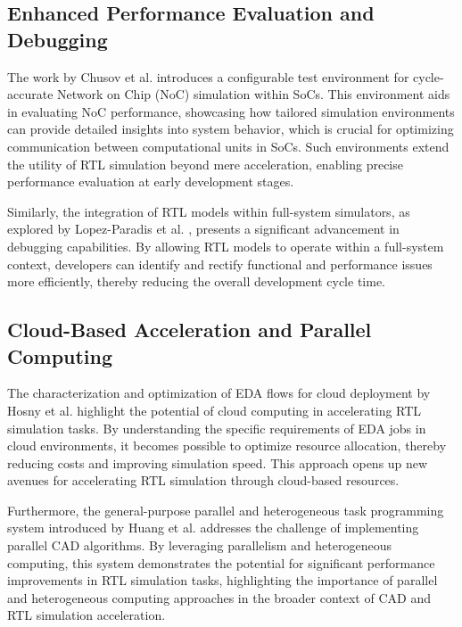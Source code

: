 \documentclass[conference]{IEEEtran}
\begin{document}
\subsection{Enhanced Performance Evaluation and Debugging}

The work by Chusov et al. \cite{chusovConfigurableTestEnvironment2021} introduces a configurable test environment for cycle-accurate Network on Chip (NoC) simulation within SoCs. This environment aids in evaluating NoC performance, showcasing how tailored simulation environments can provide detailed insights into system behavior, which is crucial for optimizing communication between computational units in SoCs. Such environments extend the utility of RTL simulation beyond mere acceleration, enabling precise performance evaluation at early development stages.

Similarly, the integration of RTL models within full-system simulators, as explored by Lopez-Paradis et al. \cite{lopez-paradisGem5RtlFramework2021}, presents a significant advancement in debugging capabilities. By allowing RTL models to operate within a full-system context, developers can identify and rectify functional and performance issues more efficiently, thereby reducing the overall development cycle time.

\subsection{Cloud-Based Acceleration and Parallel Computing}

The characterization and optimization of EDA flows for cloud deployment by Hosny et al. \cite{hosnyCharacterizingOptimizingEDA2021} highlight the potential of cloud computing in accelerating RTL simulation tasks. By understanding the specific requirements of EDA jobs in cloud environments, it becomes possible to optimize resource allocation, thereby reducing costs and improving simulation speed. This approach opens up new avenues for accelerating RTL simulation through cloud-based resources.

Furthermore, the general-purpose parallel and heterogeneous task programming system introduced by Huang et al. \cite{huangGeneralpurposeParallelHeterogeneous2020} addresses the challenge of implementing parallel CAD algorithms. By leveraging parallelism and heterogeneous computing, this system demonstrates the potential for significant performance improvements in RTL simulation tasks, highlighting the importance of parallel and heterogeneous computing approaches in the broader context of CAD and RTL simulation acceleration.
\end{document}
